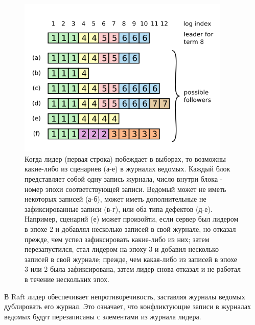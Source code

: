 \documentclass[subf, href, colorlinks=true, 14pt,
times, mtpro, specialist]{disser}
\theoremstyle{definition}
\begin{document}
\vspace{-0.26cm}

\begin{figure}[H]
\centering
\includegraphics[width=0.9\textwidth]{src/pics/log_2.png}
\caption{Когда лидер (первая строка) побеждает в выборах, то возможны какие-либо из сценариев (а-е) в журналах ведомых. Каждый блок представляет собой одну запись журнала, число внутри блока - номер эпохи соответствующей записи. Ведомый может не иметь некоторых записей (а-б), может иметь дополнительные не зафиксированные записи (в-г), или оба типа дефектов (д-е). Например, сценарий (е) может произойти, если сервер был лидером в эпохе 2 и добавлял несколько записей в свой журнале, но отказал прежде, чем успел зафиксировать какие-либо из них; затем перезапустился, стал лидером на эпоху 3 и добавил несколько записей в свой журнале; прежде, чем какая-либо из записей в эпохе 3 или 2 была зафиксирована, затем лидер снова отказал и не работал в течение нескольких эпох.}
\label{fig:log_2}
\end{figure}

В Raft лидер обеспечивает непротиворечивость, заставляя журналы ведомых дублировать его журнал. Это означает, что конфликтующие записи в журналах ведомых будут перезаписаны с элементами из журнала лидера.
\end{document}
